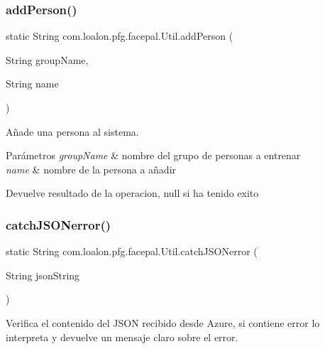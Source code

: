 \subsubsection{\texorpdfstring{add\+Person()}{addPerson()}}
{\footnotesize\ttfamily static String com.\+loalon.\+pfg.\+facepal.\+Util.\+add\+Person (\begin{DoxyParamCaption}\item[{String}]{group\+Name,  }\item[{String}]{name }\end{DoxyParamCaption})\hspace{0.3cm}{\ttfamily [static]}}



Añade una persona al sistema. 


\begin{DoxyParams}{Parámetros}
{\em group\+Name} & nombre del grupo de personas a entrenar \\
\hline
{\em name} & nombre de la persona a añadir \\
\hline
\end{DoxyParams}
\begin{DoxyReturn}{Devuelve}
resultado de la operacion, null si ha tenido exito 
\end{DoxyReturn}
\mbox{\label{classcom_1_1loalon_1_1pfg_1_1facepal_1_1_util_aa4018f950fbd192cfd731e7ec401ea9e}} 
\subsubsection{\texorpdfstring{catch\+J\+S\+O\+Nerror()}{catchJSONerror()}}
{\footnotesize\ttfamily static String com.\+loalon.\+pfg.\+facepal.\+Util.\+catch\+J\+S\+O\+Nerror (\begin{DoxyParamCaption}\item[{String}]{json\+String }\end{DoxyParamCaption})\hspace{0.3cm}{\ttfamily [static]}}



Verifica el contenido del J\+S\+ON recibido desde Azure, si contiene error lo interpreta y devuelve un mensaje claro sobre el error. 


